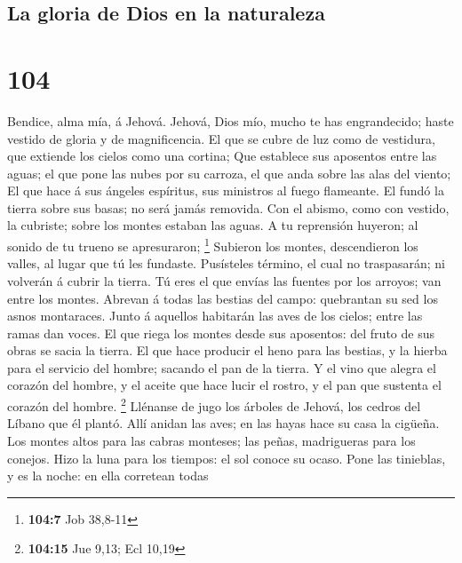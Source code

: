 \hypertarget{la-gloria-de-dios-en-la-naturaleza}{%
\subsection{La gloria de Dios en la
naturaleza}\label{la-gloria-de-dios-en-la-naturaleza}}

\hypertarget{section-103}{%
\section{104}\label{section-103}}

 Bendice, alma mía, á Jehová. Jehová, Dios mío, mucho te has
engrandecido; haste vestido de gloria y de magnificencia. 
El que se cubre de luz como de vestidura, que extiende los cielos como
una cortina;  Que establece sus aposentos entre las aguas;
el que pone las nubes por su carroza, el que anda sobre las alas del
viento;  El que hace á sus ángeles espíritus, sus ministros
al fuego flameante.  El fundó la tierra sobre sus basas; no
será jamás removida.  Con el abismo, como con vestido, la
cubriste; sobre los montes estaban las aguas.  A tu
reprensión huyeron; al sonido de tu trueno se apresuraron; \footnote{\textbf{104:7}
  Job 38,8-11}  Subieron los montes, descendieron los
valles, al lugar que tú les fundaste.  Pusísteles término,
el cual no traspasarán; ni volverán á cubrir la tierra.  Tú
eres el que envías las fuentes por los arroyos; van entre los montes.
 Abrevan á todas las bestias del campo: quebrantan su sed
los asnos montaraces.  Junto á aquellos habitarán las aves
de los cielos; entre las ramas dan voces.  El que riega los
montes desde sus aposentos: del fruto de sus obras se sacia la tierra.
 El que hace producir el heno para las bestias, y la hierba
para el servicio del hombre; sacando el pan de la tierra. 
Y el vino que alegra el corazón del hombre, y el aceite que hace lucir
el rostro, y el pan que sustenta el corazón del hombre. \footnote{\textbf{104:15}
  Jue 9,13; Ecl 10,19}  Llénanse de jugo los árboles de
Jehová, los cedros del Líbano que él plantó.  Allí anidan
las aves; en las hayas hace su casa la cigüeña.  Los montes
altos para las cabras monteses; las peñas, madrigueras para los conejos.
 Hizo la luna para los tiempos: el sol conoce su ocaso.
 Pone las tinieblas, y es la noche: en ella corretean todas
